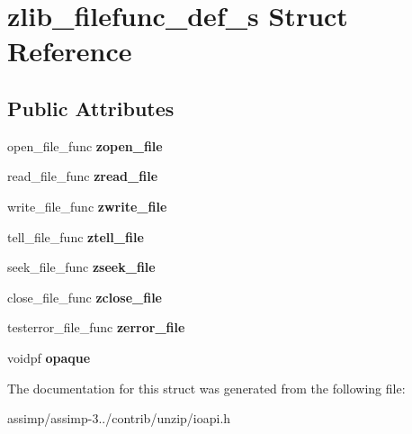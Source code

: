 \hypertarget{structzlib__filefunc__def__s}{\section{zlib\+\_\+filefunc\+\_\+def\+\_\+s Struct Reference}
\label{structzlib__filefunc__def__s}
}
\subsection*{Public Attributes}
\begin{DoxyCompactItemize}
\item 
\hypertarget{structzlib__filefunc__def__s_a49b78a559140e495b94af4d9dfe5c4e9}{open\+\_\+file\+\_\+func {\bfseries zopen\+\_\+file}}\label{structzlib__filefunc__def__s_a49b78a559140e495b94af4d9dfe5c4e9}

\item 
\hypertarget{structzlib__filefunc__def__s_ab14f748de7516525e5d2b78c47aca92e}{read\+\_\+file\+\_\+func {\bfseries zread\+\_\+file}}\label{structzlib__filefunc__def__s_ab14f748de7516525e5d2b78c47aca92e}

\item 
\hypertarget{structzlib__filefunc__def__s_a710b490fec793486ef5bedd9f2e1136d}{write\+\_\+file\+\_\+func {\bfseries zwrite\+\_\+file}}\label{structzlib__filefunc__def__s_a710b490fec793486ef5bedd9f2e1136d}

\item 
\hypertarget{structzlib__filefunc__def__s_ac8b933601443cdd83f8cc02004c77d0d}{tell\+\_\+file\+\_\+func {\bfseries ztell\+\_\+file}}\label{structzlib__filefunc__def__s_ac8b933601443cdd83f8cc02004c77d0d}

\item 
\hypertarget{structzlib__filefunc__def__s_a4747bdf97a3f44fe4b958114c11e1dcf}{seek\+\_\+file\+\_\+func {\bfseries zseek\+\_\+file}}\label{structzlib__filefunc__def__s_a4747bdf97a3f44fe4b958114c11e1dcf}

\item 
\hypertarget{structzlib__filefunc__def__s_ac46ac7ec0540dce117dab3f210d26763}{close\+\_\+file\+\_\+func {\bfseries zclose\+\_\+file}}\label{structzlib__filefunc__def__s_ac46ac7ec0540dce117dab3f210d26763}

\item 
\hypertarget{structzlib__filefunc__def__s_a61182b5b3ff83fb509b57ab4d2d9816d}{testerror\+\_\+file\+\_\+func {\bfseries zerror\+\_\+file}}\label{structzlib__filefunc__def__s_a61182b5b3ff83fb509b57ab4d2d9816d}

\item 
\hypertarget{structzlib__filefunc__def__s_a494b6d634b61bdc7fc7caed8e4fbe3f4}{voidpf {\bfseries opaque}}\label{structzlib__filefunc__def__s_a494b6d634b61bdc7fc7caed8e4fbe3f4}

\end{DoxyCompactItemize}


The documentation for this struct was generated from the following file\+:\begin{DoxyCompactItemize}
\item 
assimp/assimp-\/3../contrib/unzip/ioapi.\+h\end{DoxyCompactItemize}
